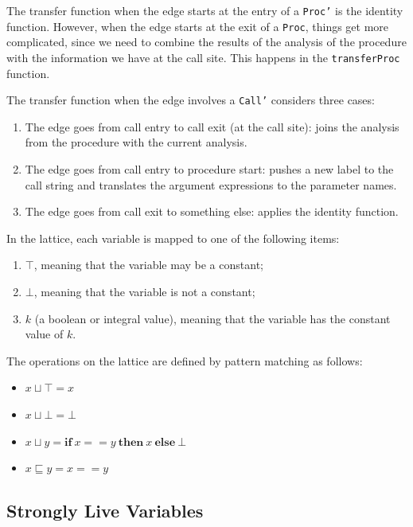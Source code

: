 \documentclass{article}
\begin{document}
The transfer function when the edge starts at the entry of a \texttt{Proc'} is the identity function. However, when the edge starts at the exit of a \texttt{Proc}, things get more complicated, since we need to combine the results of the analysis of the procedure with the information we have at the call site. This happens in the \texttt{transferProc} function.

The transfer function when the edge involves a \texttt{Call'} considers three cases:

\begin{enumerate}
	\item The edge goes from call entry to call exit (at the call site): joins the analysis from the procedure with the current analysis.
	\item The edge goes from call entry to procedure start: pushes a new label to the call string and translates the argument expressions to the parameter names.
	\item The edge goes from call exit to something else: applies the identity function.
\end{enumerate}

In the lattice, each variable is mapped to one of the following items:

\begin{enumerate}
	\item $\top$, meaning that the variable may be a constant;
	\item $\bot$, meaning that the variable is not a constant;
	\item $k$ (a boolean or integral value), meaning that the variable has the constant value of $k$.
\end{enumerate}

The operations on the lattice are defined by pattern matching as follows:

\begin{itemize}
	\item $x \sqcup \top = x$
	\item $x \sqcup \bot = \bot$
	\item $x \sqcup y = \mathbf{if}\ x == y\ \mathbf{then}\ x\ \mathbf{else}\ \bot$
	\item $x \sqsubseteq y = x == y$
\end{itemize}

\subsection*{Strongly Live Variables}
\end{document}

